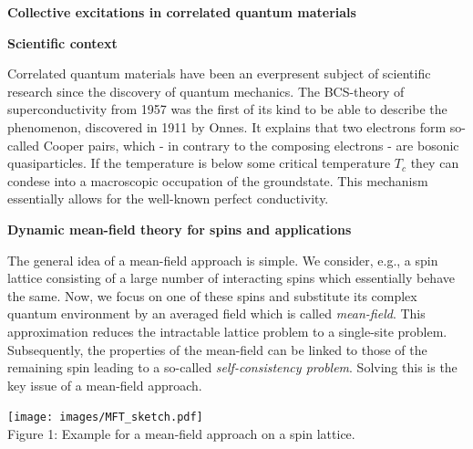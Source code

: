\documentclass[20pt]{article}
\newcommand{\mchapter}[1]{ \begin{center} \color{tugreen!95!black} \LARGE \bf \textbf{#1} \end{center}} %
\newcommand{\msection}[1]{ { \vspace{5mm} \hspace{-6mm} \large \textbf{#1}} \vspace{2mm} } %
\newcommand{\mcaption}[2]{ \\ Figure {#1}: {#2} } %
\begin{document}
\sf

\myhead

\vspace{2mm}
\mchapter{Collective excitations in correlated quantum materials}
\vspace{-3mm}

\msection{Scientific context}

Correlated quantum materials have been an everpresent subject of scientific research since the discovery of quantum mechanics.
The BCS-theory of superconductivity from 1957 was the first of its kind to be able to describe the phenomenon, discovered in 1911 by Onnes.
It explains that two electrons form so-called Cooper pairs, which - in contrary to the composing electrons - are bosonic quasiparticles.
If the temperature is below some critical temperature $T_c$ they can condese into a macroscopic occupation of the groundstate.
This mechanism essentially allows for the well-known perfect conductivity.

\msection{Dynamic mean-field theory for spins and applications}


\begin{minipage}{0.44\textwidth}
    The general idea of a mean-field approach is simple. We consider, e.g., a spin lattice consisting of a large number of interacting spins which essentially behave
    the same. Now, we focus on one of these spins and substitute its complex quantum environment by an averaged field which is called \emph{mean-field}. 
    This approximation reduces the intractable lattice problem to a single-site problem. Subsequently, the properties of the mean-field can be linked to those of 
    the remaining spin leading to a so-called \emph{self-consistency problem}. Solving this is the key issue of a mean-field approach.
\end{minipage}
\hspace{0.01\textwidth}
\begin{minipage}{0.54\textwidth}
    \begin{center}
        \texttt{[image: images/MFT\_sketch.pdf]}
        \mcaption{1}{Example for a mean-field approach on a spin lattice.}
    \end{center}
\end{minipage}
\end{document}
